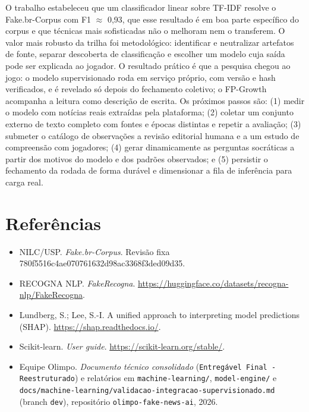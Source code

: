 \documentclass[brazilian,11pt,a4paper]{article}
\begin{document}
O trabalho estabeleceu que um classificador linear sobre TF-IDF resolve o Fake.br-Corpus com F1 $\approx$ 0,93, que esse resultado é em boa parte específico do corpus e que técnicas mais sofisticadas não o melhoram nem o transferem. O valor mais robusto da trilha foi metodológico: identificar e neutralizar artefatos de fonte, separar descoberta de classificação e escolher um modelo cuja saída pode ser explicada ao jogador. O resultado prático é que a pesquisa chegou ao jogo: o modelo supervisionado roda em serviço próprio, com versão e hash verificados, e é revelado só depois do fechamento coletivo; o FP-Growth acompanha a leitura como descrição de escrita. Os próximos passos são: (1) medir o modelo com notícias reais extraídas pela plataforma; (2) coletar um conjunto externo de texto completo com fontes e épocas distintas e repetir a avaliação; (3) submeter o catálogo de observações a revisão editorial humana e a um estudo de compreensão com jogadores; (4) gerar dinamicamente as perguntas socráticas a partir dos motivos do modelo e dos padrões observados; e (5) persistir o fechamento da rodada de forma durável e dimensionar a fila de inferência para carga real.

\section*{Referências}
\begin{itemize}[leftmargin=*,itemsep=1pt]
  \item NILC/USP. \textit{Fake.br-Corpus}. Revisão fixa 780f5516c4ae070761632d98ac3368f3ded09d35.
  \item RECOGNA NLP. \textit{FakeRecogna}. \url{https://huggingface.co/datasets/recogna-nlp/FakeRecogna}.
  \item Lundberg, S.; Lee, S.-I. A unified approach to interpreting model predictions (SHAP). \url{https://shap.readthedocs.io/}.
  \item Scikit-learn. \textit{User guide}. \url{https://scikit-learn.org/stable/}.
  \item Equipe Olimpo. \textit{Documento técnico consolidado} (\texttt{Entregável Final - Reestruturado}) e relatórios em \texttt{machine-learning/}, \texttt{model-engine/} e \texttt{docs/machine-learning/validacao-integracao-supervisionado.md} (branch \texttt{dev}), repositório \texttt{olimpo-fake-news-ai}, 2026.
\end{itemize}
\end{document}
